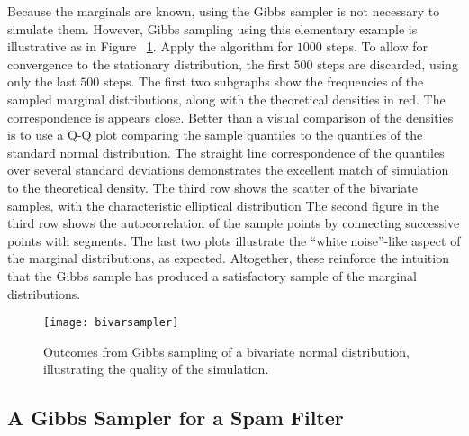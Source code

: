 \documentclass[12pt]{article}
\begin{document}
Because the marginals are known, using the Gibbs sampler is not
necessary to simulate them.  However, Gibbs sampling using this
elementary example is illustrative as in Figure~%
\ref{fig:gibbsampler:bivarsampler}.  Apply the algorithm for \( 1000 \)
steps.  To allow for convergence to the stationary distribution, the
first \( 500 \) steps are discarded, using only the last \( 500 \)
steps.  The first two subgraphs show the frequencies of the sampled
marginal distributions, along with the theoretical densities in red. The
correspondence is appears close.  Better than a visual comparison of the
densities is to use a Q-Q plot comparing the sample quantiles to the
quantiles of the standard normal distribution.  The straight line
correspondence of the quantiles over several standard deviations
demonstrates the excellent match of simulation to the theoretical
density.  The third row shows the scatter of the bivariate samples, with
the characteristic elliptical distribution The second figure in the
third row shows the autocorrelation of the sample points by connecting
successive points with segments.  The last two plots illustrate the
``white noise''-like aspect of the marginal distributions, as expected.
Altogether, these reinforce the intuition that the Gibbs sample has
produced a satisfactory sample of the marginal distributions.

\begin{figure}
    \centering
    \texttt{[image: bivarsampler]}
    \caption{Outcomes from Gibbs sampling of a bivariate normal
    distribution, illustrating the quality of the simulation.}%
    \label{fig:gibbsampler:bivarsampler}
\end{figure}

\subsection*{A Gibbs Sampler for a Spam Filter}
\end{document}
